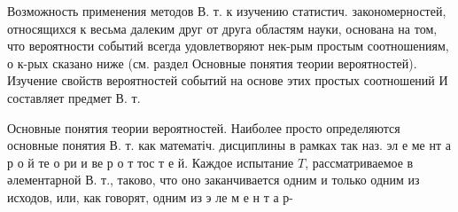 \documentclass[10pt]{article}
\begin{document}
Возможность применения методов В. т. к изучению статистич. закономерностей, относящихся к весьма далеким друг от друга областям науки, основана на том, что вероятности событий всегда удовлетворяют нек-рым простым соотношениям, о к-рых сказано ниже (см. раздел Основные понятия теории вероятностей). Изучение свойств вероятностей событий на основе этих простых соотношений И составляет предмет В. т.



Основные понятия теории вероятностей. Наиболее просто определяются основные понятия В. т. как математіч. дисциплины в рамках так наз. эл е ме нт а р о й те о ри и ве р о т тос т е й. Каждое испытание $T$, рассматриваемое в әлементарной В. т., таково, что оно заканчивается одним и только одним из исходов, или, как говорят, одним из э ле м е н т а р-
\end{document}
